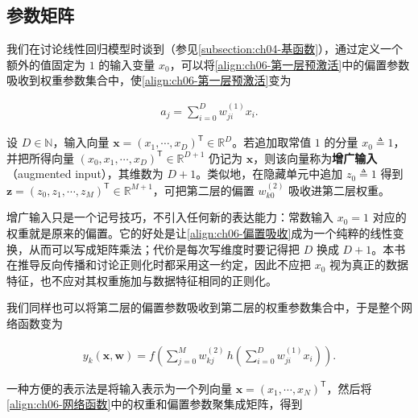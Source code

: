 \documentclass[../../main.tex]{subfiles}
\begin{document}
\subsection{参数矩阵}\label{subsection:ch06-参数矩阵}

我们在讨论线性回归模型时谈到（参见\cref{subsection:ch04-基函数}），通过定义一个额外的值固定为 $1$ 的输入变量 $x_0$，可以将\eqref{align:ch06-第一层预激活}中的偏置参数吸收到权重参数集合中，使\eqref{align:ch06-第一层预激活}变为

\begin{align}
a_j=\sum_{i=0}^{D}w_{ji}^{(1)}x_i.
\label{align:ch06-偏置吸收}
\end{align}

\begin{definition}[增广输入]\label{definition:ch06-增广输入}
设 $D\in\mathbb{N}$，输入向量 $\boldsymbol{x}=(x_{1},\cdots,x_{D})^{\mathsf T}\in\mathbb{R}^{D}$。若追加取常值 $1$ 的分量 $x_{0}\triangleq1$，并把所得向量 $(x_{0},x_{1},\cdots,x_{D})^{\mathsf T}\in\mathbb{R}^{D+1}$ 仍记为 $\boldsymbol{x}$，则该向量称为\textbf{增广输入}（augmented input），其维数为 $D+1$。类似地，在隐藏单元中追加 $z_{0}\triangleq1$ 得到 $\boldsymbol{z}=(z_{0},z_{1},\cdots,z_{M})^{\mathsf T}\in\mathbb{R}^{M+1}$，可把第二层的偏置 $w_{k0}^{(2)}$ 吸收进第二层权重。
\end{definition}

\begin{remark}增广输入只是一个记号技巧，不引入任何新的表达能力：常数输入 $x_0=1$ 对应的权重就是原来的偏置。它的好处是让\eqref{align:ch06-偏置吸收}成为一个纯粹的线性变换，从而可以写成矩阵乘法；代价是每次写维度时要记得把 $D$ 换成 $D+1$。本书在推导反向传播和讨论正则化时都采用这一约定，因此不应把 $x_0$ 视为真正的数据特征，也不应对其权重施加与数据特征相同的正则化。
\end{remark}

我们同样也可以将第二层的偏置参数吸收到第二层的权重参数集合中，于是整个网络函数变为

\begin{align}
y_k(\boldsymbol{x},\boldsymbol{w})=f\!\left(\sum_{j=0}^{M}w_{kj}^{(2)}\,h\!\left(\sum_{i=0}^{D}w_{ji}^{(1)}x_i\right)\right).
\label{align:ch06-网络函数}
\end{align}

一种方便的表示法是将输入表示为一个列向量 $\boldsymbol{x}=(x_1,\cdots,x_N)^{\mathsf T}$，然后将\eqref{align:ch06-网络函数}中的权重和偏置参数聚集成矩阵，得到
\end{document}
